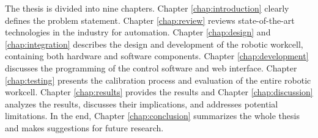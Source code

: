 The thesis is divided into nine chapters. Chapter \ref{chap:introduction} clearly defines the 
problem statement. Chapter \ref{chap:review} reviews state-of-the-art technologies in the
industry for automation. Chapter \ref{chap:design} and \ref{chap:integration} describes the design and development
of the robotic workcell, containing both hardware and software components.
Chapter \ref{chap:development} discusses the 
programming of the control software and web interface. Chapter \ref{chap:testing} 
presents the calibration process and evaluation of the entire
robotic workcell. Chapter \ref{chap:results} provides the results and Chapter \ref{chap:discussion} analyzes the results, discusses 
their implications, and addresses potential limitations. In the end, Chapter \ref{chap:conclusion}
summarizes the whole thesis and makes suggestions for
future research.